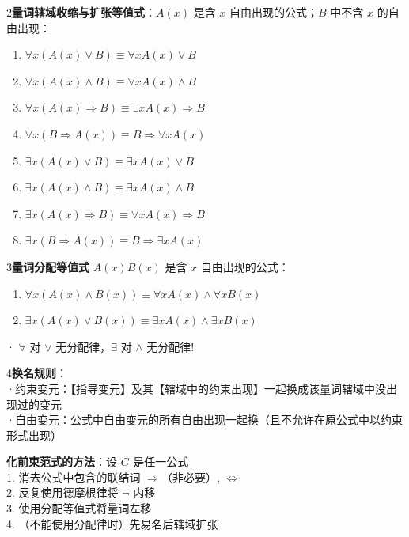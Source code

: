 	2\textbf{量词辖域收缩与扩张等值式}：$A(x)$ 是含 $x$ 自由出现的公式；$B$ 中不含 $x$ 的自由出现：
	\begin{enumerate}
		\item$\forall x (A(x) \vee B) \equiv \forall x A(x) \vee B$
		\item$\forall x (A(x) \land B) \equiv \forall x A(x) \land B$
		\item$\forall x (A(x) \Rightarrow B) \equiv \exists x A(x) \Rightarrow B$
		\item$\forall x (B \Rightarrow A(x)) \equiv B \Rightarrow \forall x A(x)$
		
		\item$\exists x (A(x) \vee B) \equiv \exists x A(x) \vee B$
		\item$\exists x (A(x) \land B) \equiv \exists x A(x) \land B$
		\item$\exists x (A(x) \Rightarrow B) \equiv \forall x A(x) \Rightarrow B$
		\item$\exists x (B \Rightarrow A(x)) \equiv B \Rightarrow \exists x A(x)$
	\end{enumerate}
	
	3\textbf{量词分配等值式} $A(x)B(x)$ 是含 $x$ 自由出现的公式：
	\begin{enumerate}
		\item $\forall x (A(x) \land B(x))  \equiv \forall x A(x) \land \forall x B(x)$
		\item $\exists x (A(x) \lor B(x))  \equiv \exists x A(x) \land \exists x B(x)$
	\end{enumerate}
	
	· $\forall$ 对 $\vee$ 无分配律，$\exists$ 对 $\land$ 无分配律!
	
	4\textbf{换名规则}：\\
	·约束变元：【指导变元】及其【辖域中的约束出现】一起换成该量词辖域中没出现过的变元\\
	·自由变元：公式中自由变元的所有自由出现一起换（且不允许在原公式中以约束形式出现）
	
	\textbf{化前束范式的方法}：设 $G$ 是任一公式\\
	1. 消去公式中包含的联结词 $\Rightarrow$（非必要）, $\Leftrightarrow$\\
	2. 反复使用德摩根律将 $\neg$ 内移\\
	3. 使用分配等值式将量词左移\\
	4. （不能使用分配律时）先易名后辖域扩张
	

